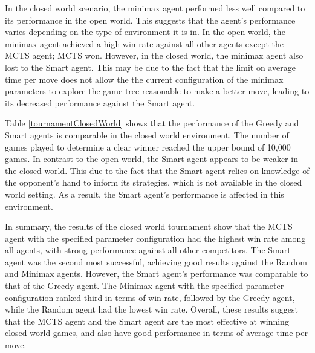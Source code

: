 In the closed world scenario, the minimax agent performed less well compared to its performance in the open world. This suggests that the agent's performance varies depending on the type of environment it is in. In the open world, the minimax agent achieved a high win rate against all other agents except the MCTS agent; MCTS won. However, in the closed world, the minimax agent also lost to the Smart agent. This may be due to the fact that the limit on average time per move does not allow the the current configuration of the minimax parameters to explore the game tree reasonable to make a better move, leading to its decreased performance against the Smart agent.

Table \ref{tournamentClosedWorld} shows that the performance of the Greedy and Smart agents is comparable in the closed world environment. The number of games played to determine a clear winner reached the upper bound of 10,000 games. In contrast to the open world, the Smart agent appears to be weaker in the closed world. This  due to the fact that the Smart agent relies on knowledge of the opponent's hand to inform its strategies, which is not available in the closed world setting. As a result, the Smart agent's performance is affected in this environment.

In summary, the results of the closed world tournament show that the MCTS agent with the specified parameter configuration had the highest win rate among all agents, with strong performance against all other competitors. The Smart agent was the second most successful, achieving good results against the Random and Minimax agents. However, the Smart agent's performance was comparable to that of the Greedy agent. The Minimax agent with the specified parameter configuration ranked third in terms of win rate, followed by the Greedy agent, while the Random agent had the lowest win rate. Overall, these results suggest that the MCTS agent and the Smart agent are the most effective at winning closed-world games, and also have good performance in terms of average time per move.